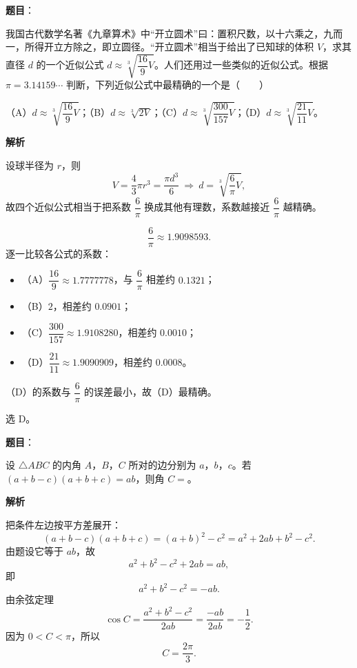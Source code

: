 \begin{answer}

\textbf{题目}：

我国古代数学名著《九章算术》中“开立圆术”曰：置积尺数，以十六乘之，九而一，所得开立方除之，即立圆径。“开立圆术”相当于给出了已知球的体积 $V$，求其直径 $d$ 的一个近似公式 $d\approx\sqrt[3]{\dfrac{16}{9}V}$。人们还用过一些类似的近似公式。根据 $\pi=3.14159\cdots$ 判断，下列近似公式中最精确的一个是\mbox{（　　）}

（A）$d\approx\sqrt[3]{\dfrac{16}{9}V}$；（B）$d\approx\sqrt[3]{2V}$；（C）$d\approx\sqrt[3]{\dfrac{300}{157}V}$；（D）$d\approx\sqrt[3]{\dfrac{21}{11}V}$。

\textbf{解析}

设球半径为 $r$，则
\nopagebreak[4]
\[V=\frac43\pi r^3=\frac{\pi d^3}{6}\ \Longrightarrow\ d=\sqrt[3]{\frac6\pi V},\]
故四个近似公式相当于把系数 $\dfrac6\pi$ 换成其他有理数，系数越接近 $\dfrac6\pi$ 越精确。

\nopagebreak[4]
\[\frac6\pi\approx1.9098593.\]
逐一比较各公式的系数：

\begin{itemize}
\item （A）$\dfrac{16}{9}\approx1.7777778$，与 $\dfrac6\pi$ 相差约 $0.1321$；
\item （B）$2$，相差约 $0.0901$；
\item （C）$\dfrac{300}{157}\approx1.9108280$，相差约 $0.0010$；
\item （D）$\dfrac{21}{11}\approx1.9090909$，相差约 $0.0008$。
\end{itemize}

（D）的系数与 $\dfrac6\pi$ 的误差最小，故（D）最精确。

选 D。


\end{answer}
\begin{answer}

\textbf{题目}：

设 $\triangle ABC$ 的内角 $A$，$B$，$C$ 所对的边分别为 $a$，$b$，$c$。若 $(a+b-c)(a+b+c)=ab$，则角 $C=$\gkblank{}。

\textbf{解析}

把条件左边按平方差展开：
\nopagebreak[4]
\[(a+b-c)(a+b+c)=(a+b)^2-c^2=a^2+2ab+b^2-c^2.\]
由题设它等于 $ab$，故
\nopagebreak[4]
\[a^2+b^2-c^2+2ab=ab,\]
即
\nopagebreak[4]
\[a^2+b^2-c^2=-ab.\]
由余弦定理
\nopagebreak[4]
\[\cos C=\frac{a^2+b^2-c^2}{2ab}=\frac{-ab}{2ab}=-\frac12.\]
因为 $0<C<\pi$，所以
\nopagebreak[4]
\[C=\frac{2\pi}{3}.\]


\end{answer}
